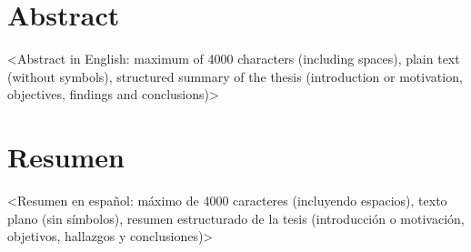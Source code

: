 %

\section*{Abstract}
\label{sec::abstract}

<Abstract in English: maximum of 4000 characters (including spaces), plain text (without symbols), structured summary of the thesis (introduction or motivation, objectives, findings and conclusions)>


\newpage
\section*{Resumen}
\label{sec::resumen}


<Resumen en español: máximo de 4000 caracteres (incluyendo espacios), texto plano (sin símbolos), resumen estructurado de la tesis (introducción o motivación, objetivos, hallazgos y conclusiones)>

